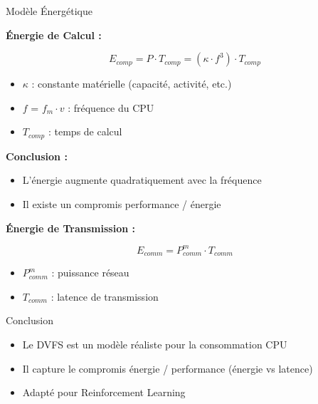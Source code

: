 \documentclass[10pt,aspectratio=169]{beamer}
\begin{document}
\begin{frame}{Modèle Énergétique}

\textbf{Énergie de Calcul :}

\begin{equation}
E_{comp} = P \cdot T_{comp} = (\kappa \cdot f^3) \cdot T_{comp}
\end{equation}

\begin{itemize}
\item $\kappa$ : constante matérielle (capacité, activité, etc.)
\item $f$ = $f_m \cdot v$ : fréquence du CPU
\item $T_{comp}$ : temps de calcul
\end{itemize}

\textbf{Conclusion :}
\begin{itemize}
\item L'énergie augmente quadratiquement avec la fréquence
\item Il existe un compromis performance / énergie
\end{itemize}

\vspace{0.2cm}

\textbf{Énergie de Transmission :}

\begin{equation}
E_{comm} = P_{comm}^m \cdot T_{comm}
\end{equation}

\begin{itemize}
\item $P_{comm}^m$ : puissance réseau
\item $T_{comm}$ : latence de transmission
\end{itemize}

\end{frame}

\begin{frame}{Conclusion}

\begin{itemize}
\item Le DVFS est un modèle réaliste pour la consommation CPU
\item Il capture le compromis énergie / performance (énergie vs latence)
\item Adapté pour Reinforcement Learning
\end{itemize}

\end{frame}
\end{document}
